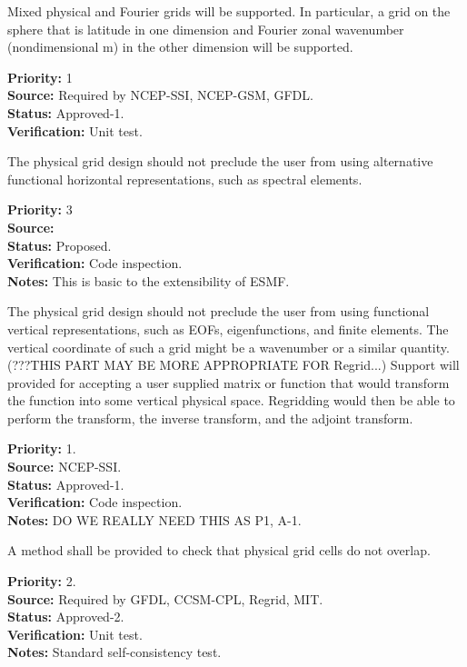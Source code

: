Mixed physical and Fourier grids will be supported. In particular, a grid on the
sphere that is latitude in one dimension and Fourier zonal wavenumber
(nondimensional m) in the other dimension will be supported.
\begin{reqlist}
{\bf Priority:} 1 \\
{\bf Source:} Required by NCEP-SSI, NCEP-GSM, GFDL. \\
{\bf Status:} Approved-1. \\
{\bf Verification:} Unit test.
\end{reqlist}

The physical grid design should not preclude the user from using alternative
functional horizontal representations, such as spectral elements.
\begin{reqlist}
{\bf Priority:} 3 \\
{\bf Source:} \\
{\bf Status:} Proposed. \\
{\bf Verification:} Code inspection. \\
{\bf Notes:} This is basic to the extensibility of ESMF.
\end{reqlist}

The physical grid design should not preclude the user from using 
functional vertical representations, such as EOFs, eigenfunctions,
and finite elements.  The vertical coordinate of such a grid might be a wavenumber
or a similar quantity.
(???THIS PART MAY BE MORE APPROPRIATE FOR Regrid...) Support will provided for
accepting a user supplied matrix or function that would transform the function into some
vertical physical space. Regridding would then be able to perform the transform, the
inverse transform, and the adjoint transform.
\begin{reqlist}
{\bf Priority:} 1. \\
{\bf Source:} NCEP-SSI. \\
{\bf Status:} Approved-1. \\
{\bf Verification:} Code inspection. \\
{\bf Notes:} DO WE REALLY NEED THIS AS P1, A-1.
\end{reqlist}

A method shall be provided to check that physical grid cells do not overlap. 
\begin{reqlist}
{\bf Priority:} 2. \\
{\bf Source:} Required by GFDL, CCSM-CPL, Regrid, MIT. \\
{\bf Status:} Approved-2. \\
{\bf Verification:} Unit test.\\
{\bf Notes:} Standard self-consistency test.
\end{reqlist}

